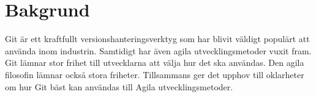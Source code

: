 \section{Bakgrund}
\label{sec:bjorn-background}

Git är ett kraftfullt versionshanteringsverktyg som har blivit väldigt populärt att använda inom industrin. Samtidigt har även agila utvecklingsmetoder vuxit fram. Git lämnar stor frihet till utvecklarna att välja hur det ska användas. Den agila filosofin lämnar också stora friheter. Tillsammans ger det upphov till oklarheter om hur Git bäst kan användas till Agila utvecklingsmetoder.
